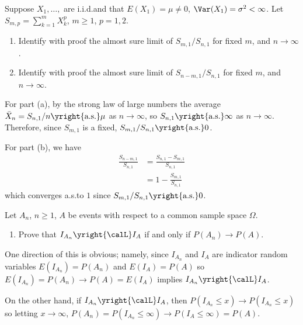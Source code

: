 \begin{problem}[DasGupta 7.4 (a), (b)]
  Suppose \(X_1,\dotsc,\) are i.i.d.\@ and that \(E(X_1)=\mu\neq 0\),
  \(\Var(X_1)=\sigma^2<\infty\). Let \(S_{m,p}=\sum_{k=1}^m X_k^p\),
  \(m\geq 1\), \(p=1,2\).
  \begin{enumerate}[label=(\alph*),noitemsep]
  \item Identify with proof the almost sure limit of \(S_{m,1}/S_{n,1}\)
    for fixed \(m\), and \(n\to\infty\).
  \item Identify with proof the almost sure limit of \(S_{n-m,1}/S_{n,1}\)
    for fixed \(m\), and \(n\to\infty\).
  \end{enumerate}
\end{problem}
\begin{solution}
  For part (a), by the strong law of large numbers the average
  \(\bar X_n=S_{n,1}/n\yright{\text{a.s.}}\mu\) as \(n\to\infty\), so
  \(S_{n,1}\yright{\text{a.s.}}\infty\) as \(n\to\infty\). Therefore, since
  \(S_{m,1}\) is a fixed, \(S_{m,1}/S_{n,1}\yright{\text{a.s.}} 0\).

  For part (b), we have
  \begin{align*}
    \frac{S_{n-m,1}}{S_{n,1}}
    &=\frac{S_{n,1} - S_{m,1}}{S_{n,1}}\\
    &=%
      1-\frac{S_{m,1}}{S_{n,1}}
  \end{align*}
  which converges a.s.\@ to \(1\) since
  \(S_{m,1}/S_{n,1}\yright{\text{a.s.}} 0\).
\end{solution}
\newpage

\begin{problem}[DasGupta 7.5 (a)]
  Let \(A_n\), \(n\geq 1\), \(A\) be events with respect to a common sample
  space \(\Omega\).
  \begin{enumerate}[label=(\alph*),noitemsep]
  \item Prove that \(I_{A_n}\yright{\calL} I_A\) if and only if \(P(A_n)\to
    P(A)\).
  \end{enumerate}
\end{problem}
\begin{solution}
  One direction of this is obvious; namely, since \(I_{A_n}\) and \(I_A\)
  are indicator random variables \(E(I_{A_n})=P(A_n)\) and \(E(I_A)=P(A)\)
  so \(E(I_{A_n})=P(A_n)\to P(A)=E(I_A)\) implies \(I_{A_n}\yright{\calL}
  I_A\).

  On the other hand, if \(I_{A_n}\yright{\calL} I_A\), then \(P(I_{A_n}\leq
  x)\to P(I_{A_n}\leq x)\) so letting \(x\to\infty\),
  \(P(A_n)=P(I_{A_n}\leq\infty)\to P(I_A\leq\infty)=P(A)\).
\end{solution}
\newpage

